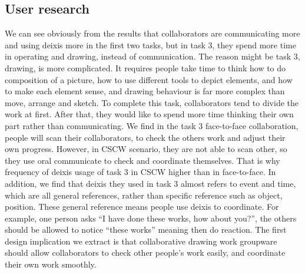 \documentclass[12pt,twoside]{article}
\begin{document}
\subsection{User research}
We can see obviously from the results that collaborators are communicating more and using deixis more in the first two tasks, but in task 3, they spend more time in operating and drawing, instead of communication. The reason might be task 3, drawing, is more complicated. It requires people take time to think how to do composition of a picture, how to use different tools to depict elements, and how to make each element sense, and drawing behaviour is far more complex than move, arrange and sketch. To complete this task, collaborators tend to divide the work at first. After that, they would like to spend more time thinking their own part rather than communicating. We find in the task 3 face-to-face collaboration, people will scan their collaborators, to check the others work and adjust their own progress. However, in CSCW scenario, they are not able to scan other, so they use oral communicate to check and coordinate themselves. That is why frequency of deixis usage of task 3 in CSCW higher than in face-to-face.  In addition, we find that deixis they used in task 3 almost refers to event and time, which are all general references, rather than specific reference such as object, position. These general reference means people use deixis to coordinate. For example, one person asks “I have done these works, how about you?”, the others should be allowed to notice “these works” meaning then do reaction. The first design implication we extract is that collaborative drawing work groupware should allow collaborators to check other people’s work easily, and coordinate their own work smoothly.
\end{document}
